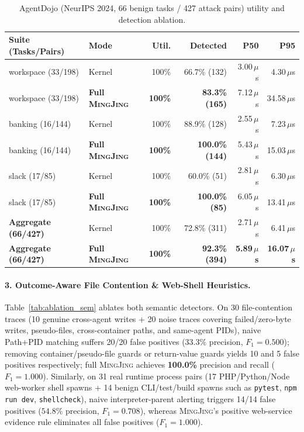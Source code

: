 \documentclass[10pt,twocolumn,letterpaper]{article}
\newcommand{\sys}{\textsc{MingJing}}
\newcommand{\code}[1]{\texttt{\small #1}}
\begin{document}
\begin{table}[t]
\centering
\scriptsize
\setlength{\tabcolsep}{1.8pt}
\caption{AgentDojo (NeurIPS 2024, 66 benign tasks / 427 attack pairs) utility and detection ablation.}
\label{tab:ablation_agentdojo}
\begin{tabular}{@{}llrrrr@{}}
\toprule
\textbf{Suite (Tasks/Pairs)} & \textbf{Mode} & \textbf{Util.} & \textbf{Detected} & \textbf{P50} & \textbf{P95} \\
\midrule
workspace (33/198) & Kernel & 100\% & 66.7\% (132) & 3.00\,$\mu$s & 4.30\,$\mu$s \\
workspace (33/198) & \textbf{Full \sys{}} & \textbf{100\%} & \textbf{83.3\% (165)} & 7.12\,$\mu$s & 34.58\,$\mu$s \\
\addlinespace[1pt]
banking (16/144)   & Kernel & 100\% & 88.9\% (128) & 2.55\,$\mu$s & 7.23\,$\mu$s \\
banking (16/144)   & \textbf{Full \sys{}} & \textbf{100\%} & \textbf{100.0\% (144)} & 5.43\,$\mu$s & 15.03\,$\mu$s \\
\addlinespace[1pt]
slack (17/85)      & Kernel & 100\% & 60.0\% (51) & 2.81\,$\mu$s & 6.30\,$\mu$s \\
slack (17/85)      & \textbf{Full \sys{}} & \textbf{100\%} & \textbf{100.0\% (85)} & 6.05\,$\mu$s & 13.41\,$\mu$s \\
\midrule
\textbf{Aggregate (66/427)} & Kernel & 100\% & 72.8\% (311) & 2.71\,$\mu$s & 6.41\,$\mu$s \\
\textbf{Aggregate (66/427)} & \textbf{Full \sys{}} & \textbf{100\%} & \textbf{92.3\% (394)} & \textbf{5.89\,$\mu$s} & \textbf{16.07\,$\mu$s} \\
\bottomrule
\end{tabular}
\end{table}

\paragraph{3. Outcome-Aware File Contention \& Web-Shell Heuristics.}
Table~\ref{tab:ablation_sem} ablates both semantic detectors. On 30 file-contention traces (10 genuine cross-agent writes + 20 noise traces covering failed/zero-byte writes, pseudo-files, cross-container paths, and same-agent PIDs), naive Path+PID matching suffers 20/20 false positives ($33.3\%$ precision, $F_1=0.500$); removing container/pseudo-file guards or return-value guards yields 10 and 5 false positives respectively; full \sys{} achieves \textbf{100.0\%} precision and recall ($F_1=1.000$). Similarly, on 31 real runtime process pairs (17 PHP/Python/Node web-worker shell spawns + 14 benign CLI/test/build spawns such as \code{pytest}, \code{npm run dev}, \code{shellcheck}), naive interpreter-parent alerting triggers 14/14 false positives ($54.8\%$ precision, $F_1=0.708$), whereas \sys{}'s positive web-service evidence rule eliminates all false positives ($F_1=\mathbf{1.000}$).
\end{document}
